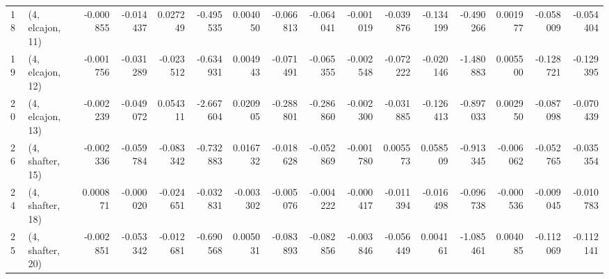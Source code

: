 \begin{tabular}{llrrrrrrrrrrrrrr}
18 &  (4, elcajon, 11) &  -0.000855 & -0.014437 &  0.027249 &  -0.495535 &  0.004050 &  -0.066813 & -0.064041 & -0.001019 & -0.039876 & -0.134199 &  -0.490266 &  0.001977 & -0.058009 & -0.054404 \\
19 &  (4, elcajon, 12) &  -0.001756 & -0.031289 & -0.023512 &  -0.634931 &  0.004943 &  -0.071491 & -0.065355 & -0.002548 & -0.072222 & -0.020146 &  -1.480883 &  0.005500 & -0.128721 & -0.129395 \\
20 &  (4, elcajon, 13) &  -0.002239 & -0.049072 &  0.054311 &  -2.667604 &  0.020905 &  -0.288801 & -0.286860 & -0.002300 & -0.031885 & -0.126413 &  -0.897033 &  0.002950 & -0.087098 & -0.070439 \\
26 &  (4, shafter, 15) &  -0.002336 & -0.059784 & -0.083342 &  -0.732883 &  0.016732 &  -0.018628 & -0.052869 & -0.001780 &  0.005573 &  0.058509 &  -0.913345 & -0.006062 & -0.052765 & -0.035354 \\
24 &  (4, shafter, 18) &   0.000871 & -0.000020 & -0.024651 &  -0.032831 & -0.003302 &  -0.005076 & -0.004222 & -0.000417 & -0.011394 & -0.016498 &  -0.096738 & -0.000536 & -0.009045 & -0.010783 \\
25 &  (4, shafter, 20) &  -0.002851 & -0.053342 & -0.012681 &  -0.690568 &  0.005031 &  -0.083893 & -0.082856 & -0.003846 & -0.056449 &  0.004161 &  -1.085461 &  0.004085 & -0.112069 & -0.112141 \\
\bottomrule
\end{tabular}
